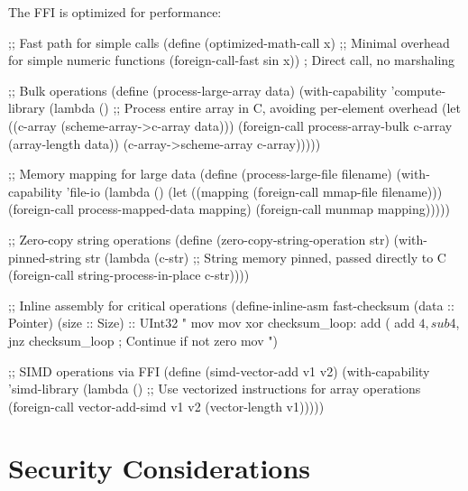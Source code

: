 
The FFI is optimized for performance:

\begin{example}
\begin{lambdustcode}
;; Fast path for simple calls
(define (optimized-math-call x)
  ;; Minimal overhead for simple numeric functions
  (foreign-call-fast sin x))  ; Direct call, no marshaling

;; Bulk operations
(define (process-large-array data)
  (with-capability 'compute-library
    (lambda ()
      ;; Process entire array in C, avoiding per-element overhead
      (let ((c-array (scheme-array->c-array data)))
        (foreign-call process-array-bulk c-array (array-length data))
        (c-array->scheme-array c-array)))))

;; Memory mapping for large data
(define (process-large-file filename)
  (with-capability 'file-io
    (lambda ()
      (let ((mapping (foreign-call mmap-file filename)))
        (foreign-call process-mapped-data mapping)
        (foreign-call munmap mapping)))))

;; Zero-copy string operations  
(define (zero-copy-string-operation str)
  (with-pinned-string str
    (lambda (c-str)
      ;; String memory pinned, passed directly to C
      (foreign-call string-process-in-place c-str))))

;; Inline assembly for critical operations
(define-inline-asm fast-checksum (data :: Pointer) (size :: Size) :: UInt32
  "
  mov %
  mov %
  xor %
  checksum_loop:
    add (%
    add $4, %
    sub $4, %
    jnz checksum_loop ; Continue if not zero
  mov %
  ")

;; SIMD operations via FFI
(define (simd-vector-add v1 v2)
  (with-capability 'simd-library
    (lambda ()
      ;; Use vectorized instructions for array operations
      (foreign-call vector-add-simd v1 v2 (vector-length v1)))))
\end{lambdustcode}
\end{example}

\section{Security Considerations}
\label{sec:ffi-security}

